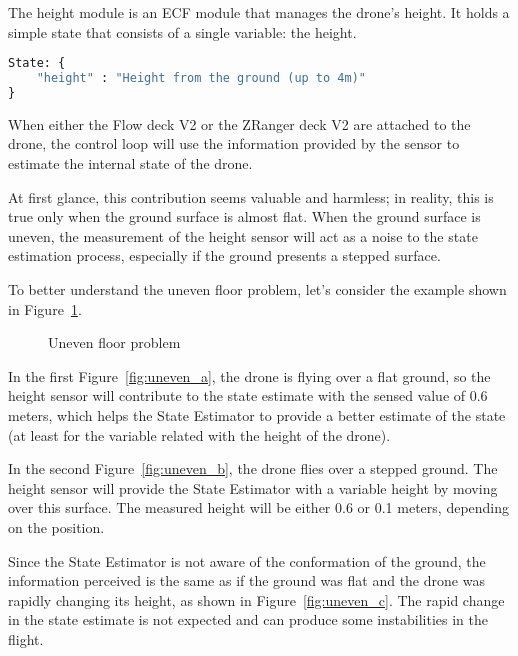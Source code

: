 The height module is an ECF module that manages the drone's height. It holds a simple state that consists of a single variable: the height.
\begin{lstlisting}[language=Python]
State: {
    "height" : "Height from the ground (up to 4m)"
}
\end{lstlisting}

When either the Flow deck V2 or the ZRanger deck V2 are attached to the drone, the control loop will use the information provided by the sensor to estimate the internal state of the drone.

At first glance, this contribution seems valuable and harmless; in reality, this is true only when the ground surface is almost flat.
When the ground surface is uneven, the measurement of the height sensor will act as a noise to the state estimation process, especially if the ground presents a stepped surface.

To better understand the uneven floor problem, let's consider the example shown in Figure~\ref{fig:uneven_floor}.

\begin{figure}[h]
    \centering
    \quad
    \quad
    \caption{Uneven floor problem}\label{fig:uneven_floor}
\end{figure}

In the first Figure~\ref{fig:uneven_a}, the drone is flying over a flat ground, so the height sensor will contribute to the state estimate with the sensed value of 0.6 meters, which helps the State Estimator to provide a better estimate of the state (at least for the variable related with the height of the drone).

In the second Figure~\ref{fig:uneven_b}, the drone flies over a stepped ground. 
The height sensor will provide the State Estimator with a variable height by moving over this surface. 
The measured height will be either 0.6 or 0.1 meters, depending on the position.

Since the State Estimator is not aware of the conformation of the ground, the information perceived is the same as if the ground was flat and the drone was rapidly changing its height, as shown in Figure~\ref{fig:uneven_c}. 
The rapid change in the state estimate is not expected and can produce some instabilities in the flight.

